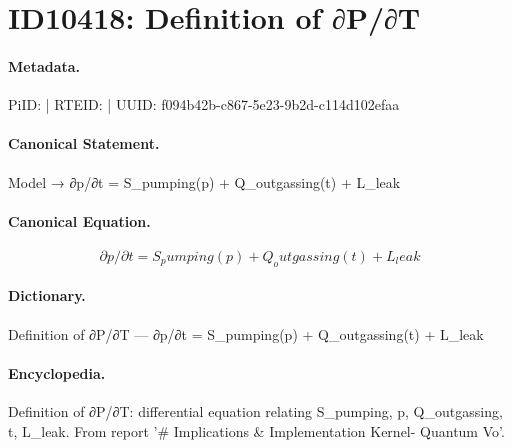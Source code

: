 \section*{ID10418: Definition of ∂P/∂T}
\paragraph{Metadata.}
PiID:  | RTEID:  | UUID: f094b42b-c867-5e23-9b2d-c114d102efaa

\paragraph{Canonical Statement.}
Model → ∂p/∂t = S\_pumping(p) + Q\_outgassing(t) + L\_leak

\paragraph{Canonical Equation.}
\[
∂p/∂t = S_pumping(p) + Q_outgassing(t) + L_leak
\]

\paragraph{Dictionary.}
Definition of ∂P/∂T — ∂p/∂t = S\_pumping(p) + Q\_outgassing(t) + L\_leak

\paragraph{Encyclopedia.}
Definition of ∂P/∂T: differential equation relating S\_pumping, p, Q\_outgassing, t, L\_leak. From report '\# Implications \& Implementation Kernel- Quantum Vo'.
